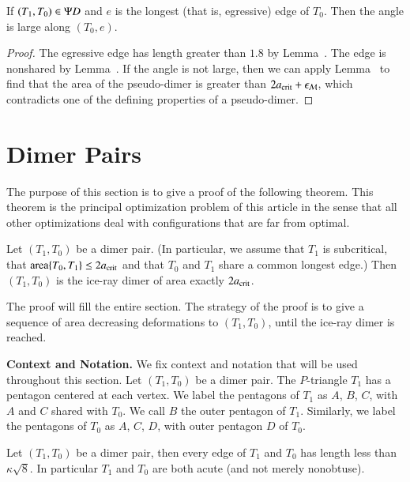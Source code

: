 \begin{corollary}
  If $(T_1,T_0)\in \Psi D$ and $e$ is the longest (that is, egressive)
  edge of $T_0$.  Then the angle is large along $(T_0,e)$.
\end{corollary}

\begin{proof} %
  The egressive edge has length greater than $1.8$ by Lemma~.
  The edge is nonshared by Lemma~.
  If the angle is not large, then we can apply Lemma~ to find that
  the area of the pseudo-dimer is greater than $2a_\text{crit} + \epsilon_{\mathcal M}$,
  which contradicts one of the defining properties of a pseudo-dimer.
\end{proof}

\section{Dimer Pairs}

The purpose of this section is to give a proof of the following
theorem.  This theorem is the principal optimization problem of this
article in the sense that all other optimizations deal with
configurations that are far from optimal.

\begin{theorem}
  Let $(T_1,T_0)$ be a dimer pair.  (In particular, we assume that
  $T_1$ is subcritical, that ${\operatorname{area}}\{T_0,T_1\}\le 2a_\text{crit}$ and that
  $T_0$ and $T_1$ share a common longest edge.)  Then $(T_1,T_0)$ is
  the ice-ray dimer of area exactly $2a_\text{crit}$.
\end{theorem}

The proof will fill the entire section.  The strategy of the proof is
to give a sequence of area decreasing deformations to $(T_1,T_0)$,
until the ice-ray dimer is reached.

\noindent
{\bf Context and Notation.} We fix context and
notation that will be used throughout this section. Let
$(T_1,T_0)$ be a dimer pair.  The $P$-triangle $T_1$ has a pentagon
centered at each vertex.  We label the pentagons of $T_1$ as $A$, $B$,
$C$, with $A$ and $C$ shared with $T_0$.  We call $B$ the outer
pentagon of $T_1$.  Similarly, we label the pentagons of $T_0$ as $A$,
$C$, $D$, with outer pentagon $D$ of $T_0$.

\begin{lemma}  
  Let $(T_1,T_0)$ be a dimer pair, then every edge of $T_1$ and $T_0$
  has length less than $\kappa\sqrt8$.  In particular $T_1$ and $T_0$
  are both acute (and not merely nonobtuse).
\end{lemma}

